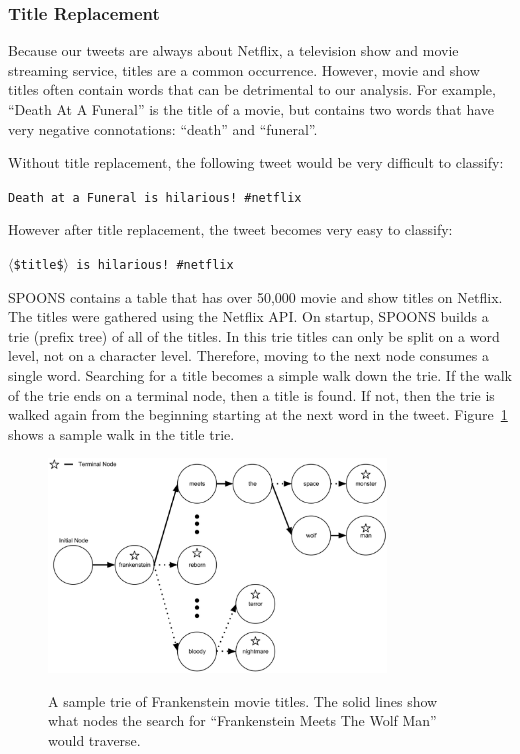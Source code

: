\documentclass[12pt]{ucthesis}
\newcommand{\captionfonts}{\small\bf\ssp}
\begin{document}
\subsubsection{Title Replacement}
\label{class-filter-title}
Because our tweets are always about Netflix, a television show and movie streaming service,
titles are a common occurrence. However, movie and show titles often contain words that can be
detrimental to our analysis. For example, ``Death At A Funeral'' is the title of a movie, but contains
two words that have very negative connotations: ``death'' and ``funeral''.

Without title replacement, the following tweet would be very difficult to classify:

\begin{center}
   \texttt{Death at a Funeral is hilarious!  \#netflix}
\end{center}

However after title replacement, the tweet becomes very easy to classify:

\begin{center}
   \texttt{$\langle$\$title\$$\rangle$ is hilarious!  \#netflix}
\end{center}

SPOONS contains a table that has over 50,000 movie and show titles on Netflix. The titles were gathered
using the Netflix API. On startup, SPOONS builds a trie (prefix tree)\cite{trie} of all of the titles. In this trie titles can
only be split on a word level, not on a character level. Therefore, moving to the next node consumes a single word.
Searching for a title becomes a simple walk down the trie.
If the walk of the trie ends on a terminal node, then a title is found. If not, then the trie is walked again from the beginning
starting at the next word in the tweet. Figure~\ref{fig:title-trie} shows a sample walk in the title trie.


\begin{figure}
   \begin{center}
      \includegraphics[width=0.8\textwidth]{images/Title_Trie.eps}
      \captionfonts
      \caption[Title Trie Walk]{A sample trie of Frankenstein movie titles. The solid lines show what nodes the search for ``Frankenstein Meets The Wolf Man'' would traverse.}
      \label{fig:title-trie}
   \end{center}
\end{figure}
\end{document}
